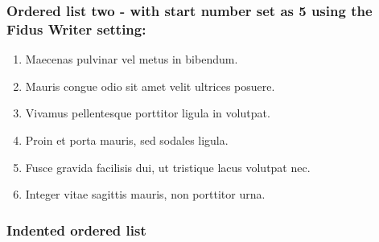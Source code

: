 \documentclass{article}
\begin{document}
\subsubsection{Ordered list two - with start number set as 5 using the Fidus Writer setting:}\label{H6844251}


\begin{enumerate}[start=5]
\item Maecenas pulvinar vel metus in bibendum. 


\item Mauris congue odio sit amet velit ultrices posuere. 


\item Vivamus pellentesque porttitor ligula in volutpat. 


\item Proin et porta mauris, sed sodales ligula. 


\item Fusce gravida facilisis dui, ut tristique lacus volutpat nec. 


\item Integer vitae sagittis mauris, non porttitor urna.


\end{enumerate}

\subsubsection{Indented ordered list}\label{H8647294}
\end{document}
